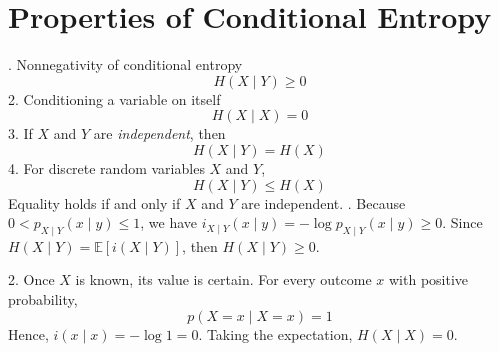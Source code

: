 \documentclass[11pt]{report}
\theoremstyle{lecturedefinition}
\theoremstyle{lectureremark}
\begin{document}
\section{Properties of Conditional Entropy}
\begin{property}
. Nonnegativity of conditional entropy
\begin{equation*}
    H(X\mid Y)\ge 0
\end{equation*}
2. Conditioning a variable on itself
\begin{equation*}
    H(X\mid X)=0
\end{equation*}
3. If $X$ and $Y$ are \textit{independent}, then
\begin{equation*}
    H(X\mid Y)=H(X)
\end{equation*}
4. For discrete random variables $X$ and $Y$,
\begin{equation*}
    H(X\mid Y)\le H(X)
\end{equation*}
Equality holds if and only if $X$ and $Y$ are independent.
\tcblower
{}. Because $0<p_{X\mid Y}(x\mid y)\le 1$, we have $i_{X\mid Y}(x\mid y)=-\log p_{X\mid Y}(x\mid y)\ge 0$. Since $H(X\mid Y)=\mathbb{E}[i(X\mid Y)]$, then $H(X\mid Y)\ge 0$.

2. Once $X$ is known, its value is certain. For every outcome $x$ with positive probability,
\begin{equation*}
    p(X=x\mid X=x)=1
\end{equation*}
Hence, $i(x\mid x)=-\log 1=0$. Taking the expectation, $H(X\mid X)=0$.


\end{property}
\end{document}
